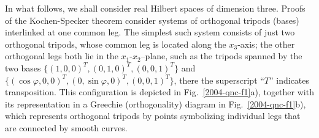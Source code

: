 \documentclass[prl,showpacs,showkeys,amsfonts]{revtex4}
\begin{document}
In what follows, we shall consider real Hilbert spaces of dimension three.
Proofs of the Kochen-Specker theorem consider
systems of orthogonal tripods (bases) interlinked at one common leg.
The simplest such system consists of just two orthogonal tripods, whose common leg
is located along the $x_3$-axis;
the other orthogonal legs both lie in the $x_1$-$x_2$--plane,
such as the tripods spanned by the two bases
$
\{
(1,0,0)^T,
(0,1,0)^T,
(0,0,1)^T
\}
$
and
$
\{
(\cos \varphi , 0,0)^T,
(0,\sin \varphi , 0)^T,
(0,0,1)^T
\}
$, there the superscript ``$T$'' indicates transposition.
This configuration is depicted in Fig.~\ref{2004-qnc-f1}a), together with
its representation in a Greechie (orthogonality) diagram \cite{greechie:71} in Fig.~\ref{2004-qnc-f1}b),
which represents orthogonal tripods by points symbolizing individual legs that are connected by smooth curves.
\end{document}
